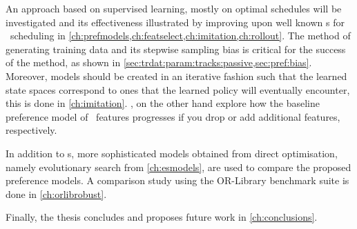 An approach based on supervised learning, mostly on optimal schedules will be 
investigated and its effectiveness illustrated by improving upon well known 
\dr s for \jsp\ scheduling in \cref{ch:prefmodels,ch:featselect,ch:imitation,ch:rollout}. 
The method of generating training data and its stepwise sampling bias is 
critical for the success of the method, as shown in 
\cref{sec:trdat:param:tracks:passive,sec:pref:bias}.
Moreover, models should be created in an iterative fashion such that the learned state spaces correspond to ones that the learned policy will eventually encounter, this is done in \cref{ch:imitation}.
, on the other hand explore how the baseline preference model of \NrFeatLocal\ features progresses if you drop or add additional features, respectively. 

In addition to \sdr s, more sophisticated models obtained from direct optimisation, namely evolutionary search from \cref{ch:esmodels}, are used to compare the proposed preference models. 
A comparison study using the OR-Library benchmark suite is done in 
\cref{ch:orlibrobust}.

Finally, the thesis concludes and proposes future work in \cref{ch:conclusions}.

